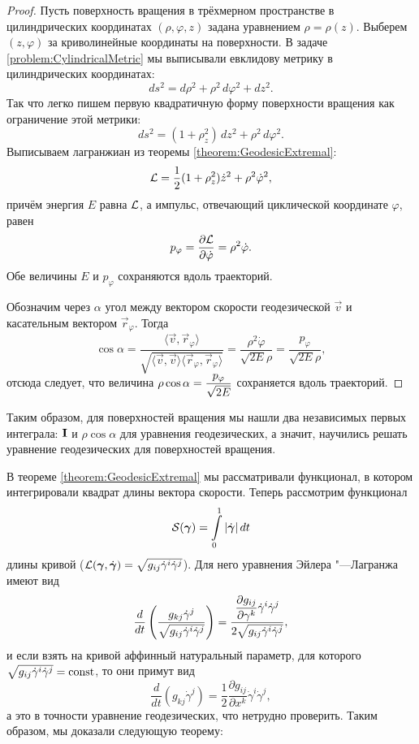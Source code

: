 \begin{proof}
	Пусть поверхность вращения в трёхмерном пространстве в цилиндрических координатах $(\rho, \varphi, z)$ задана уравнением $\rho = \rho(z)$. Выберем $(z, \varphi)$ за криволинейные координаты на поверхности. В задаче \ref{problem:CylindricalMetric} мы выписывали евклидову метрику в цилиндрических координатах:
	\[
		ds^2 = d\rho^2 + \rho^2\,d\varphi^2 + dz^2.
	\]
	Так что легко пишем первую квадратичную форму поверхности вращения как ограничение этой метрики:
	\[
		ds^2 = (1 + \rho_z^2)\,dz^2 + \rho^2\,d\varphi^2.
	\]
	Выписываем лагранжиан из теоремы \ref{theorem:GeodesicExtremal}:
	\[
		\mathcal{L} = \frac{1}{2}(1 + \rho_z^2)\dot{z}^2 + \rho^2\dot{\varphi}^2,
	\]
	причём энергия $E$ равна $\mathcal{L}$, а импульс, отвечающий циклической координате $\varphi$, равен
	\[
		p_\varphi = \frac{\partial\mathcal{L}}{\partial\dot{\varphi}} = \rho^2\dot{\varphi}.
	\]
	Обе величины $E$ и $p_\varphi$ сохраняются вдоль траекторий.

	Обозначим через $\alpha$ угол между вектором скорости геодезической $\vec{v}$ и касательным вектором $\vec{r}_\varphi$. Тогда
	\[
		\cos\alpha = \frac{\langle\vec{v}, \vec{r}_\varphi\rangle}{\sqrt{\langle\vec{v}, \vec{v}\rangle\langle\vec{r}_\varphi, \vec{r}_\varphi\rangle}} = \frac{\rho^2\dot{\varphi}}{\sqrt{2E}\rho} = \frac{p_\varphi}{\sqrt{2E}\rho},
	\]
	отсюда следует, что величина $\displaystyle\rho\cos\alpha = \frac{p_\varphi}{\sqrt{2E}}$ сохраняется вдоль траекторий.
\end{proof}

Таким образом, для поверхностей вращения мы нашли два независимых первых интеграла: $\boldsymbol{\operatorname{I}}$ и $\rho\cos\alpha$ для уравнения геодезических, а значит, научились решать уравнение геодезических для поверхностей вращения.

В теореме \ref{theorem:GeodesicExtremal} мы рассматривали функционал, в котором интегрировали квадрат длины вектора скорости. Теперь рассмотрим функционал
\[
	\mathcal{S}(\boldsymbol{\gamma}) = \int\limits_0^1\left\lvert\dot{\boldsymbol{\gamma}}\right\rvert dt
\]
длины кривой ($\mathcal{L}(\boldsymbol{\gamma}, \dot{\boldsymbol{\gamma}}) = \sqrt{g_{ij}\dot{\gamma}^i\dot{\gamma}^j}$). Для него уравнения Эйлера "---Лагранжа имеют вид
\[
	\frac{d}{dt}\left(\frac{g_{kj}\dot{\gamma}^j}{\sqrt{g_{ij}\dot{\gamma}^i\dot{\gamma}^j}}\right) = \frac{\displaystyle\frac{\partial g_{ij}}{\partial\gamma^k}\dot{\gamma}^i\dot{\gamma}^j}{2\sqrt{g_{ij}\dot{\gamma}^i\dot{\gamma}^j}},
\]
и если взять на кривой аффинный натуральный параметр, для которого $\sqrt{g_{ij}\dot{\gamma}^i\dot{\gamma}^j} = \mathrm{const}$, то они примут вид
\[
	\frac{d}{dt}(g_{kj}\dot{\gamma}^j) = \frac{1}{2}\frac{\partial g_{ij}}{\partial x^k}\dot{\gamma}^i\dot{\gamma}^j,
\]
а это в точности уравнение геодезических, что нетрудно проверить. Таким образом, мы доказали следующую теорему:

